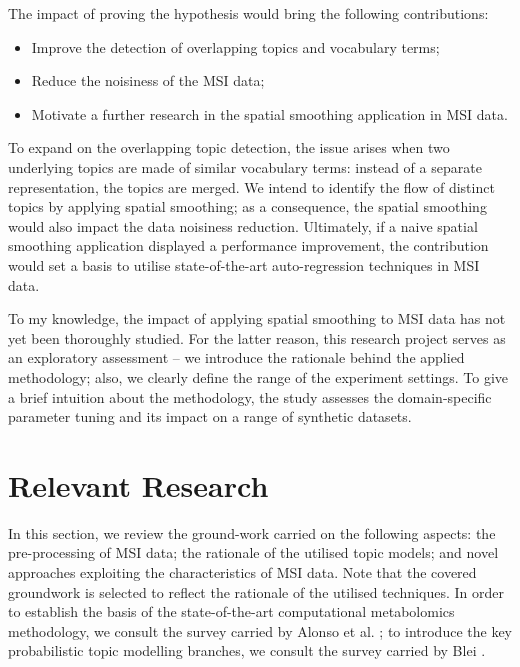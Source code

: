 \documentclass{mpaper}
\begin{document}
\par The impact of proving the hypothesis would bring the following contributions:
\begin{itemize}
	\item Improve the detection of overlapping topics and vocabulary terms;
	\item Reduce the noisiness of the MSI data;
	\item Motivate a further research in the spatial smoothing application in MSI data.
\end{itemize} 
To expand on the overlapping topic detection, the issue arises when two underlying topics are made of similar vocabulary terms: instead of a separate representation, the topics are merged. We intend to identify the flow of distinct topics by applying spatial smoothing; as a consequence, the spatial smoothing would also impact the data noisiness reduction. Ultimately, if a naive spatial smoothing application displayed a performance improvement, the contribution would set a basis to utilise state-of-the-art auto-regression techniques in MSI data.

\par To my knowledge, the impact of applying spatial smoothing to MSI data has not yet been thoroughly studied. For the latter reason, this research project serves as an exploratory assessment -- we introduce the rationale behind the applied methodology; also, we clearly define the range of the experiment settings. To give a brief intuition about the methodology, the study assesses the domain-specific parameter tuning and its impact on a range of synthetic datasets.

\section{Relevant Research}

\par In this section, we review the ground-work carried on the following aspects: the pre-processing of MSI data; the rationale of the utilised topic models; and novel approaches exploiting the characteristics of MSI data. Note that the covered groundwork is selected to reflect the rationale of the utilised techniques. In order to establish the basis of the state-of-the-art computational metabolomics methodology, we consult the survey carried by Alonso et al. \cite{alonso2015analytical}; to introduce the key probabilistic topic modelling branches, we consult the survey carried by Blei \cite{blei2012probabilistic}. 
\end{document}
